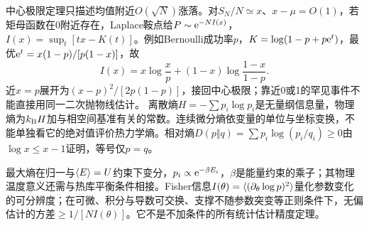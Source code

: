 中心极限定理只描述均值附近$O(\sqrt N)$涨落。对$S_N/N\simeq x$、$x-\mu=O(1)$，若矩母函数在0附近存在，Laplace鞍点给$P\sim\mathrm e^{-NI(x)}$，$I(x)=\sup_t[tx-K(t)]$。例如Bernoulli成功率$p$，$K=\log(1-p+p\mathrm e^t)$，最优$\mathrm e^t=x(1-p)/[p(1-x)]$，故
\begin{equation}
I(x)=x\log\frac xp+(1-x)\log\frac{1-x}{1-p}.
\end{equation}
近$x=p$展开为$(x-p)^2/[2p(1-p)]$，接回中心极限；靠近0或1的罕见事件不能直接用同一二次抛物线估计。
离散熵$H=-\sum p_i\log p_i$是无量纲信息量，物理熵为$k_{\mathrm B} H$加与相空间基准有关的常数。连续微分熵依变量的单位与坐标变换，不能单独看它的绝对值评价热力学熵。相对熵$D(p\Vert q)=\sum p_i\log(p_i/q_i)\ge0$由$\log x\le x-1$证明，等号仅$p=q$。

最大熵在归一与$\langle E\rangle=U$约束下变分，$p_i\propto\mathrm e^{-\beta E_i}$，$\beta$是能量约束的乘子；其物理温度意义还需与热库平衡条件相接。Fisher信息$I(\theta)=\langle (\partial_\theta\log p)^2\rangle$量化参数变化的可分辨度；在可微、积分与导数可交换、支撑不随参数突变等正则条件下，无偏估计的方差$\ge1/[NI(\theta)]$。它不是不加条件的所有统计估计精度定理。
